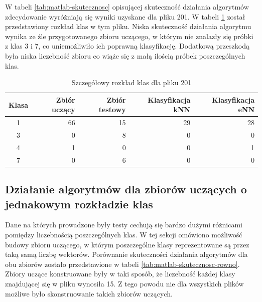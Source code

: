 W tabeli \ref{tab:matlab-skutecznosc} opisującej skuteczność działania algorytmów zdecydowanie wyróżniają się wyniki uzyskane dla pliku 201. W tabeli \ref{tab:matlab-plik201} został przedstawiony rozkład klas w tym pliku. Niska skuteczność działania algorytmu wynika ze źle przygotowanego zbioru uczącego, w którym nie znalazły się próbki z klas 3 i 7, co uniemożliwiło ich poprawną klasyfikację. Dodatkową przeszkodą była niska liczebność zbioru co wiąże się z małą ilością próbek poszczególnych klas.

\begin{table}[H]
	\centering
	\begin{tabular}{|c|r|r|r|r|}
		\hline
		
		Klasa & Zbiór uczący & Zbiór testowy & Klasyfikacja kNN & Klasyfikacja eNN \\
		\hline
		1 & 66 & 15 & 29 & 28 \\
		\hline 
		3 & 0 & 8 & 0 & 0 \\
		\hline
		4 & 1 & 0 & 0 & 1 \\
		\hline
		7 & 0 & 6 & 0 & 0 \\
		\hline
		
	\end{tabular}
	\caption{Szczegółowy rozkład klas dla pliku 201}
	\label{tab:matlab-plik201}
\end{table}

\subsection{Działanie algorytmów dla zbiorów uczących o jednakowym rozkładzie klas}

Dane na których prowadzone były testy cechują się bardzo dużymi różnicami pomiędzy liczebnością poszczególnych klas. W tej sekcji omówiono możliwość budowy  zbioru uczącego, w którym poszczególne klasy reprezentowane są przez taką samą liczbę wektorów. Porównanie skuteczności działania algorytmów dla obu zbiorów zostało przedstawione w tabeli \ref{tab:matlab-skutecznosc-rowno}. Zbiory uczące konstruowane były w taki sposób, że liczebność każdej klasy znajdującej się w pliku wynosiła 15. Z tego powodu nie dla wszystkich plików możliwe było skonstruowanie takich zbiorów uczących.


